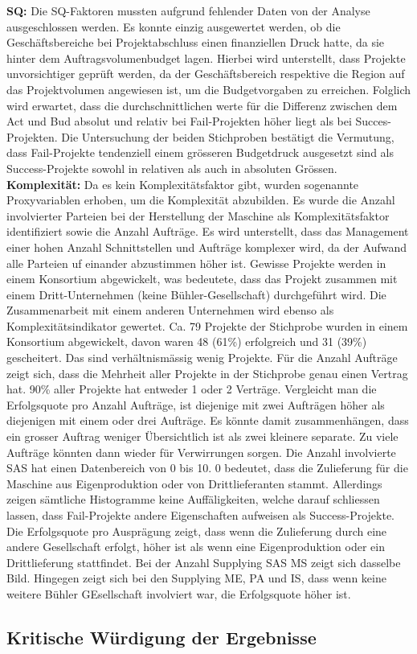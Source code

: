 \newline\textbf{SQ:} Die SQ-Faktoren mussten aufgrund fehlender Daten von der Analyse ausgeschlossen werden. Es konnte einzig ausgewertet werden, ob die Geschäftsbereiche bei Projektabschluss einen finanziellen Druck hatte, da sie hinter dem Auftragsvolumenbudget lagen. Hierbei wird unterstellt, dass Projekte unvorsichtiger geprüft werden, da der Geschäftsbereich respektive die Region auf das Projektvolumen angewiesen ist, um die Budgetvorgaben zu erreichen. Folglich wird erwartet, dass die durchschnittlichen werte für die Differenz zwischen dem Act und Bud absolut und relativ bei Fail-Projekten höher liegt als bei Succes-Projekten. Die Untersuchung der beiden Stichproben bestätigt die Vermutung, dass Fail-Projekte tendenziell einem grösseren Budgetdruck ausgesetzt sind als Success-Projekte sowohl in relativen als auch in absoluten Grössen.
\newline\textbf{Komplexität:} Da es kein Komplexitätsfaktor gibt, wurden sogenannte Proxyvariablen erhoben, um die Komplexität abzubilden. Es wurde die Anzahl involvierter Parteien bei der Herstellung der Maschine als Komplexitätsfaktor identifiziert sowie die Anzahl Aufträge. Es wird unterstellt, dass das Management einer hohen Anzahl Schnittstellen und Aufträge komplexer wird, da der Aufwand alle Parteien uf einander abzustimmen höher ist. Gewisse Projekte werden in einem Konsortium abgewickelt, was bedeutete, dass das Projekt zusammen mit einem Dritt-Unternehmen (keine Bühler-Gesellschaft) durchgeführt wird. Die Zusammenarbeit mit einem anderen Unternehmen wird ebenso als Komplexitätsindikator gewertet. Ca. 79 Projekte der Stichprobe wurden in einem Konsortium abgewickelt, davon waren 48 (61\%) erfolgreich und 31 (39\%) gescheitert. Das sind verhältnismässig wenig Projekte.\newline
Für die Anzahl Aufträge zeigt sich, dass die Mehrheit aller Projekte in der Stichprobe genau einen Vertrag hat. 90\% aller Projekte hat entweder 1 oder 2 Verträge. Vergleicht man die Erfolgsquote pro Anzahl Aufträge, ist diejenige mit zwei Aufträgen höher als diejenigen mit einem oder drei Aufträge. Es könnte damit zusammenhängen, dass ein grosser Auftrag weniger Übersichtlich ist als zwei kleinere separate. Zu viele Aufträge könnten dann wieder für Verwirrungen sorgen.\newline
Die Anzahl involvierte SAS hat einen Datenbereich von 0 bis 10. 0 bedeutet, dass die Zulieferung für die Maschine aus Eigenproduktion oder von Drittlieferanten stammt.  Allerdings zeigen sämtliche Histogramme keine Auffäligkeiten, welche darauf schliessen lassen, dass Fail-Projekte andere Eigenschaften aufweisen als Success-Projekte. Die Erfolgsquote pro Ausprägung zeigt, dass wenn die Zulieferung durch eine andere Gesellschaft erfolgt, höher ist als wenn eine Eigenproduktion oder ein Drittlieferung stattfindet. Bei der Anzahl Supplying SAS MS zeigt sich dasselbe Bild. Hingegen zeigt sich bei den Supplying ME, PA und IS, dass wenn keine weitere Bühler GEsellschaft involviert war, die Erfolgsquote höher ist.

\subsection{Kritische Würdigung der Ergebnisse}
\newpage	
	


